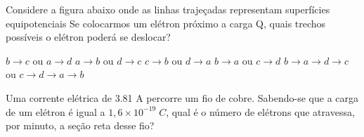 \documentclass[12pt, addpoints]{exam}
\begin{document}
    \begin{questions}
\begin{multicols*}{2}
\question Considere a figura abaixo onde as linhas trajeçadas representam superfícies equipotenciais Se colocarmos um elétron próximo a carga Q, quais trechos possíveis o elétron poderá se deslocar?
        
        \begin{center}
            \begin{minipage}[c]{0.5\linewidth}
            \end{minipage}
        \end{center}
        
        

\begin{choices}
\choice $b\rightarrow c$ ou $a\rightarrow d$ 
\choice $a\rightarrow b$ ou $d\rightarrow c$ 
\choice $c\rightarrow b$ ou $d\rightarrow a$ 
\choice $b\rightarrow a$ ou $c\rightarrow d$ 
\choice $b\rightarrow a\rightarrow d\rightarrow c$ ou $c\rightarrow d\rightarrow a\rightarrow b$ 
\end{choices}
\question Uma corrente elétrica de    3.81 A percorre um ﬁo de cobre. Sabendo-se que a carga de um elétron é igual a $1,6\times 10^{-19}\;C$, qual é o número de elétrons que atravessa, por minuto, a seção reta desse ﬁo?


\end{multicols*}
\end{questions}
\end{document}

